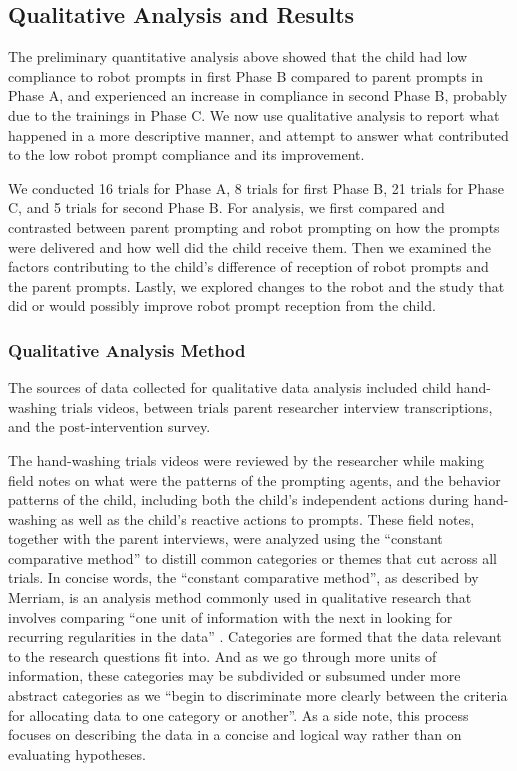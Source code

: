 \subsection{Qualitative Analysis and Results}
\label{sec:QualitativeData_results}
The preliminary quantitative analysis above showed that the child had low compliance to robot prompts in first Phase B compared to parent prompts in Phase A, and experienced an increase in compliance in second Phase B, probably due to the trainings in Phase C.  We now use qualitative analysis to report what happened in a more descriptive manner, and attempt to answer what contributed to the low robot prompt compliance and its improvement.

We conducted 16 trials for Phase A, 8 trials for first Phase B, 21 trials for Phase C, and 5 trials for second Phase B.  For analysis, we first compared and contrasted between parent prompting and robot prompting on how the prompts were delivered and how well did the child receive them.  Then we examined the factors contributing to the child's difference of reception of robot prompts and the parent prompts.  Lastly, we explored changes to the robot and the study that did or would possibly improve robot prompt reception from the child.

\subsubsection{Qualitative Analysis Method}
The sources of data collected for qualitative data analysis included child hand-washing trials videos, between trials parent researcher interview transcriptions, and the post-intervention survey.

The hand-washing trials videos were reviewed by the researcher while making field notes on what were the patterns of the prompting agents, and the behavior patterns of the child, including both the child's independent actions during hand-washing as well as the child's reactive actions to prompts.  These field notes, together with the parent interviews, were analyzed using the ``constant comparative method'' to distill common categories or themes that cut across all trials.  In concise words, the ``constant comparative method'', as described by Merriam, is an analysis method commonly used in qualitative research that involves comparing ``one unit of information with the next in looking for recurring regularities in the data'' \cite{merriam2014qualitative}.  Categories are formed that the data relevant to the research questions fit into.  And as we go through more units of information, these categories may be subdivided or subsumed under more abstract categories as we ``begin to discriminate more clearly between the criteria for allocating data to one category or another''.  As a side note, this process focuses on describing the data in a concise and logical way rather than on evaluating hypotheses.

